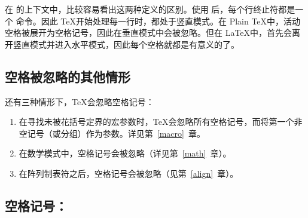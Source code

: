\documentclass{book}
\begin{document}
在  的上下文中，比较容易看出这两种定义的区别。使用  后，每个行终止符都是一个  命令。因此 \TeX 开始处理每一行时，都处于竖直模式。在 Plain \TeX 中，活动空格被展开为空格记号，因此在垂直模式中会被忽略。但在 \LaTeX 中，首先会离开竖直模式并进入水平模式，因此每个空格就都是有意义的了。

\subsection{空格被忽略的其他情形}

还有三种情形下，\TeX 会忽略空格记号：
\alt
\begin{enumerate}
\item 在寻找未被花括号定界的宏参数时，\TeX 会忽略所有空格记号，而将第一个非空记号（或分组）作为参数。详见第~\ref{macro}~章。

\item 在数学模式中，空格记号会被忽略（详见第~\ref{math}~章）。

\item 在阵列制表符之后，空格记号会被忽略（见第~\ref{align}~章）。
\end{enumerate}

\subsection{空格记号：}
\end{document}
